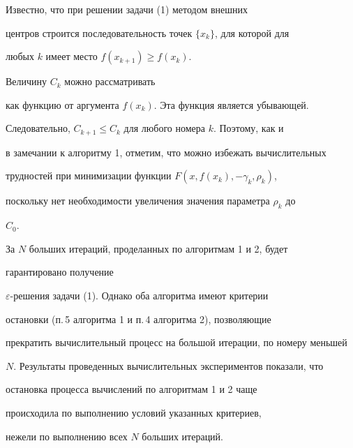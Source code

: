 \begin{notenonum}


Известно, что при решении задачи (1) методом внешних


центров строится последовательность точек $\{x_k\}$, для которой для


любых $k$ имеет место $f(x_{k+1})\ge f(x_k)$.


Величину $C_k$ можно рассматривать


как функцию от аргумента $f(x_k)$. Эта функция является убывающей.


Следовательно, $C_{k+1}\le C_k$ для любого номера $k$. Поэтому, как и


в замечании к алгоритму 1, отметим, что можно избежать вычислительных


трудностей при минимизации функции $F(x,f(x_k),-\gamma_k,\rho_k)$,


поскольку нет необходимости увеличения значения параметра $\rho_k$ до 


$C_0$.


\end{notenonum}





За $N$ больших итераций, проделанных по алгоритмам 1 и 2, будет 


гарантировано получение


$\varepsilon$-решения задачи (1). Однако оба алгоритма имеют критерии


остановки (п.\,5 алгоритма 1 и п.\,4 алгоритма 2), позволяющие


прекратить вычислительный процесс на большой итерации, по номеру меньшей


$N$. Результаты проведенных вычислительных экспериментов показали, что 


остановка процесса вычислений по алгоритмам 1 и 2 чаще 


происходила по выполнению условий указанных критериев,


нежели по выполнению всех $N$ больших итераций. 





